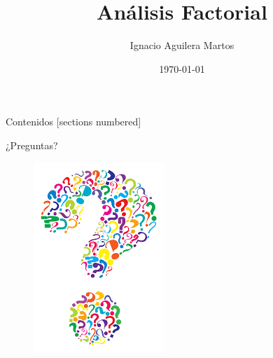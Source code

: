 \documentclass[10pt]{beamer}
\title{Análisis Factorial}
\author{Ignacio Aguilera Martos}
\date{\today}
\institute{Estadística Multivariante \\ \href{https://github.com/nacheteam/Analisis-Factorial}{Link: \underline{Documentos LaTeX en GitHub}}}
\begin{document}
\maketitle

\begin{frame}[fragile]{Contenidos}
  [sections numbered]
  \tableofcontents[hideallsubsections]
\end{frame}



\begin{frame}[standout]
	\LARGE{¿Preguntas?}
	\vspace{10px}
	\begin{figure}
		\includegraphics[scale=0.5]{./Imagenes/preguntas.png}
	\end{figure}
\end{frame}
\end{document}
